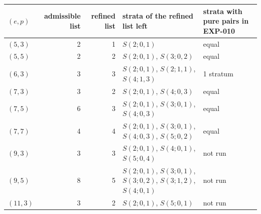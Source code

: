 \begin{tabular}{@{}lrr>{\raggedright\arraybackslash}p{6.2cm}l@{}}
\toprule
$(e,p)$ & admissible list & refined list & strata of the refined list left & strata with pure pairs in EXP-010\\
\midrule
$(5,3)$ & 2 & 1 & $S(2;0,1)$ & equal\\
$(5,5)$ & 2 & 2 & $S(2;0,1)$, $S(3;0,2)$ & equal\\
$(6,3)$ & 3 & 3 & $S(2;0,1)$, $S(2;1,1)$, $S(4;1,3)$ & 1 stratum\\
$(7,3)$ & 3 & 2 & $S(2;0,1)$, $S(4;0,3)$ & equal\\
$(7,5)$ & 6 & 3 & $S(2;0,1)$, $S(3;0,1)$, $S(4;0,3)$ & equal\\
$(7,7)$ & 4 & 4 & $S(2;0,1)$, $S(3;0,1)$, $S(4;0,3)$, $S(5;0,2)$ & equal\\
$(9,3)$ & 3 & 3 & $S(2;0,1)$, $S(4;0,1)$, $S(5;0,4)$ & not run\\
$(9,5)$ & 8 & 5 & $S(2;0,1)$, $S(3;0,1)$, $S(3;0,2)$, $S(3;1,2)$, $S(4;0,1)$ & not run\\
$(11,3)$ & 3 & 2 & $S(2;0,1)$, $S(5;0,1)$ & not run\\
\bottomrule
\end{tabular}
